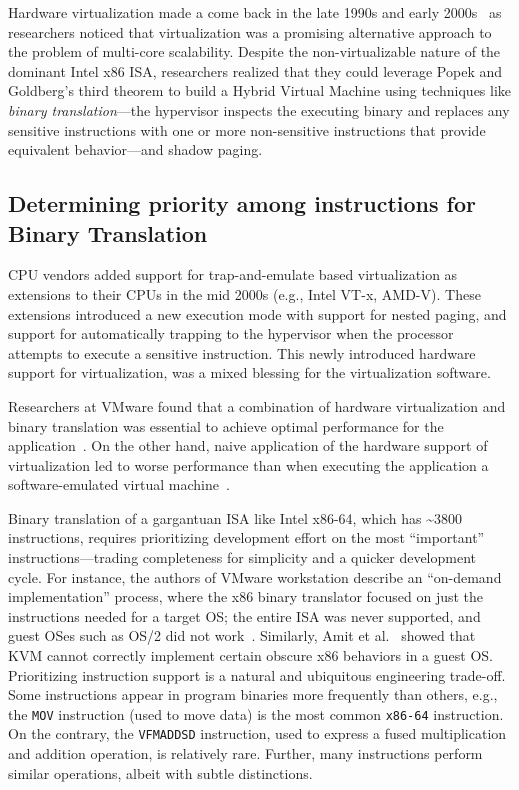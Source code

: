 Hardware virtualization made a come back in the late 1990s and early
2000s~\cite{bugnion-disco, denali, xen} as researchers noticed that
virtualization was a promising alternative approach to the problem of
multi-core scalability. Despite the non-virtualizable nature of the dominant
Intel x86 ISA, researchers realized that they could leverage Popek and
Goldberg's third theorem to build a Hybrid Virtual Machine using techniques
like \emph{binary translation}---the hypervisor inspects the executing binary
and replaces any sensitive instructions with one or more non-sensitive
instructions that provide equivalent behavior---and shadow paging.

\subsection{Determining priority among instructions for Binary Translation}

CPU vendors added support for trap-and-emulate based virtualization as
extensions to their CPUs in the mid 2000s (e.g., Intel VT-x, AMD-V).
These extensions introduced a new execution mode with support for nested
paging, and support for automatically trapping to the hypervisor when the
processor attempts to execute a sensitive instruction. This newly introduced
hardware support for virtualization, was a mixed blessing for the
virtualization software.

Researchers at VMware found that a combination of hardware virtualization and
binary translation was essential to achieve optimal performance for the
application~\cite{vmware-esx-bt-plus-vtx}. On the other hand, naive
application of the hardware support of virtualization led to worse performance
than when executing the application a software-emulated virtual machine~\cite{Adams2006-qw}.

Binary translation of a gargantuan ISA like Intel x86-64, which has
\textasciitilde{}3800 instructions, requires prioritizing development effort
on the most ``important'' instructions---trading completeness for simplicity
and a quicker development cycle.
For instance, the authors of VMware workstation describe an ``on-demand
implementation'' process, where the x86 binary translator focused on just the
instructions needed for a target OS; the entire ISA was never supported, and
guest OSes such as OS/2 did not work~\cite{bugnion-workstation}.
Similarly, Amit et al.~\cite{amit-161} showed that KVM cannot correctly
implement certain obscure x86 behaviors in a guest OS.
Prioritizing instruction support is a natural and ubiquitous engineering
trade-off. Some instructions appear in program binaries more frequently than
others, e.g., the \texttt{MOV} instruction (used to move data) is the most
common \texttt{x86-64} instruction. On the contrary, the \texttt{VFM\-ADD\-SD}
instruction, used to express a fused multiplication and addition operation, is
relatively rare. Further, many instructions perform similar operations, albeit
with subtle distinctions.

